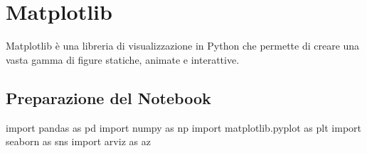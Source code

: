 \documentclass[
  letterpaper,
  krantz2]{{[}./krantz{]}}
\newenvironment{Shaded}{\begin{snugshade}}{\end{snugshade}}
\newcommand{\ImportTok}[1]{\textcolor[rgb]{0.00,0.46,0.62}{#1}}
\newcommand{\NormalTok}[1]{\textcolor[rgb]{0.00,0.23,0.31}{#1}}
\begin{document}
\chapter{Matplotlib}\label{sec-matplotlib}

Matplotlib è una libreria di visualizzazione in Python che permette di
creare una vasta gamma di figure statiche, animate e interattive.

\section{Preparazione del Notebook}\label{preparazione-del-notebook-2}

\begin{Shaded}
\begin{Highlighting}[]
\ImportTok{import}\NormalTok{ pandas }\ImportTok{as}\NormalTok{ pd}
\ImportTok{import}\NormalTok{ numpy }\ImportTok{as}\NormalTok{ np}
\ImportTok{import}\NormalTok{ matplotlib.pyplot }\ImportTok{as}\NormalTok{ plt}
\ImportTok{import}\NormalTok{ seaborn }\ImportTok{as}\NormalTok{ sns}
\ImportTok{import}\NormalTok{ arviz }\ImportTok{as}\NormalTok{ az}
\end{Highlighting}
\end{Shaded}
\end{document}
